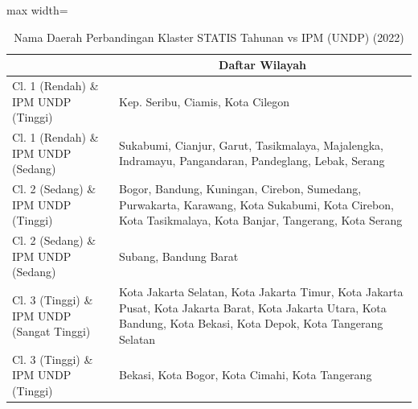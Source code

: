 \begin{table}[H]
\centering
\caption{Nama Daerah Perbandingan Klaster STATIS Tahunan vs IPM (UNDP) (2022)} \label{tab:app1statis_ipm_name_2022}
\begin{adjustbox}{max width=\textwidth}
\begin{tabular}{|>{\centering\arraybackslash}p{4cm}|p{10cm}|}
\hline
\multicolumn{1}{|c|}{\textbf{Kategori}} & \multicolumn{1}{c|}{\textbf{Daftar Wilayah}} \\
\hline
Cl. 1 (Rendah) \& IPM UNDP (Tinggi) & Kep. Seribu, Ciamis, Kota Cilegon \\
\hline
Cl. 1 (Rendah) \& IPM UNDP (Sedang) & Sukabumi, Cianjur, Garut, Tasikmalaya, Majalengka, Indramayu, Pangandaran, Pandeglang, Lebak, Serang \\
\hline
Cl. 2 (Sedang) \& IPM UNDP (Tinggi) & Bogor, Bandung, Kuningan, Cirebon, Sumedang, Purwakarta, Karawang, Kota Sukabumi, Kota Cirebon, Kota Tasikmalaya, Kota Banjar, Tangerang, Kota Serang \\
\hline
Cl. 2 (Sedang) \& IPM UNDP (Sedang) & Subang, Bandung Barat \\
\hline
Cl. 3 (Tinggi) \& IPM UNDP (Sangat Tinggi) & Kota Jakarta Selatan, Kota Jakarta Timur, Kota Jakarta Pusat, Kota Jakarta Barat, Kota Jakarta Utara, Kota Bandung, Kota Bekasi, Kota Depok, Kota Tangerang Selatan \\
\hline
Cl. 3 (Tinggi) \& IPM UNDP (Tinggi) & Bekasi, Kota Bogor, Kota Cimahi, Kota Tangerang \\
\hline
\end{tabular}
\end{adjustbox}
\end{table}